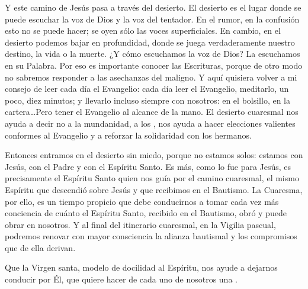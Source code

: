 \begin{body}
Y este camino de Jesús pasa a través del desierto. El desierto es el lugar donde se puede escuchar la voz de Dios y la voz del tentador. En el rumor, en la confusión esto no se puede hacer; se oyen sólo las voces superficiales. En cambio, en el desierto podemos bajar en profundidad, donde se juega verdaderamente nuestro destino, la vida o la muerte. ¿Y cómo escuchamos la voz de Dios? La escuchamos en su Palabra. Por eso es importante conocer las Escrituras, porque de otro modo no sabremos responder a las asechanzas del maligno. Y aquí quisiera volver a mi consejo de leer cada día el Evangelio: cada día leer el Evangelio, meditarlo, un poco, diez minutos; y llevarlo incluso siempre con nosotros: en el bolsillo, en la cartera\ldots Pero tener el Evangelio al alcance de la mano. El desierto cuaresmal nos ayuda a decir no a la mundanidad, a los , nos ayuda a hacer elecciones valientes conformes al Evangelio y a reforzar la solidaridad con los hermanos.

Entonces entramos en el desierto sin miedo, porque no estamos solos: estamos con Jesús, con el Padre y con el Espíritu Santo. Es más, como lo fue para Jesús, es precisamente el Espíritu Santo quien nos guía por el camino cuaresmal, el mismo Espíritu que descendió sobre Jesús y que recibimos en el Bautismo. La Cuaresma, por ello, es un tiempo propicio que debe conducirnos a tomar cada vez más conciencia de cuánto el Espíritu Santo, recibido en el Bautismo, obró y puede obrar en nosotros. Y al final del itinerario cuaresmal, en la Vigilia pascual, podremos renovar con mayor consciencia la alianza bautismal y los compromisos que de ella derivan.

Que la Virgen santa, modelo de docilidad al Espíritu, nos ayude a dejarnos conducir por Él, que quiere hacer de cada uno de nosotros una .


\end{body}

\label{b2-03-01-2015A}
\newpage


